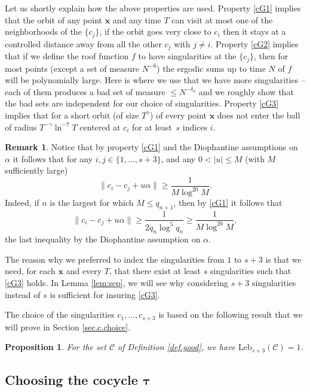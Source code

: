 \documentclass[JEP,XML,SOM,Unicode,NoFloatCountersInSection]{cedram}
\newcommand\cC{\mathcal{C}}
\newcommand\bx{\boldsymbol{x}}
\newcommand\btau{{\boldsymbol{\tau}}}
\newcommand\Leb{\mathrm{Leb}}
\theoremstyle{definition}
\newtheorem{remark}[definition]{Remark}
\theoremstyle{plain}
\newtheorem{proposition}[definition]{Proposition}
\begin{document}
{ Let us shortly explain how the above properties are used. Property \eqref{cG1} implies that the orbit of any point $\bx$ and any time $T$ can visit at most one of the neighborhoods of the $\{c_j\}$, \ie if the orbit goes very close to $c_i$ then it stays at a controlled distance away from all the other $c_j$ with $j\neq i$. Property \eqref{cG2} implies that if we define the roof function $f$ to have singularities at the $\{c_j\}$, then for most points (except a set of measure $N^{-6}$) the ergodic sums up to time $N$ of $f$ will be polynomially large. Here is where we use that we have more singularities -- each of them produces a bad set of measure $\leq N^{-\delta_0}$ and we roughly show that the bad sets are independent for our choice of singularities. Property \eqref{cG3} implies that for a short orbit (of size $T^\gamma$) of every point $\bx$ does not enter the ball of radius $T^{-\gamma}\ln^{-7}T$ centered at $c_i$ for at least~$s$ indices $i$.}

\medskip
\begin{remark}\label{rem:toadd} Notice that by property \eqref{cG1} and the Diophantine assumptions on $\alpha$ it follows that for any $i,j\in \{1,\ldots, s+3\}$, and any $0<|u|\leq M$ (with $M$ sufficiently large)
\[
\|c_i-c_j+u\alpha\|\geq \frac{1}{M\log^{20}M}.
\]
Indeed, if $n$ is the largest for which $M\leq q_{n+1}$, then by \eqref{cG1} it follows that
\[
\|c_i-c_j+u\alpha\|\geq \frac{1}{2q_n\log^5 q_n}\geq \frac{1}{M\log^{20}M},
\]
the last inequality by the Diophantine assumption on $\alpha$.
\end{remark}

The reason why we preferred to index the singularities from $1$ to $s+3$ is that we need, for each
$\bx$ and every $T$, that there exist at least $s$ singularities such that \eqref{cG3} holds. In Lemma \ref{lem:sep}, we will see why considering $s+3$ singularities instead of $s$ is sufficient for insuring \eqref{cG3}.

The choice of the singularities $c_1,\ldots,c_{s+3}$ is based on the following result that we will prove in Section \ref{sec.c.choice}.

\begin{proposition} \label{prop.choice.c} For the set $\cC$ of Definition \ref{def.good}, we have
$\Leb_{s+3}(\cC)=1$.
\end{proposition}

\subsection{Choosing the cocycle $\btau$} \label{sec.tau.choice}
\end{document}
